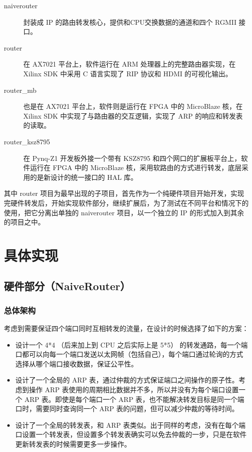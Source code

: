 \documentclass{ctexart}
\begin{document}
  \begin{description}
    \item[naiverouter] 封装成 IP 的路由转发核心，提供和CPU交换数据的通道和四个 RGMII 接口。
    \item[router]  在 AX7021 平台上，软件运行在 ARM 处理器上的完整路由器实现，在 Xilinx SDK 中采用 C 语言实现了 RIP 协议和 HDMI 的可视化输出。
    \item[router\_mb] 也是在 AX7021 平台上，软件则是运行在 FPGA 中的 MicroBlaze  核，在 Xilinx SDK 中实现了与路由器的交互逻辑，实现了 ARP 的响应和转发表的读取。
    \item[router\_ksz8795] 在 Pynq-Z1 开发板外接一个带有 KSZ8795 和四个网口的扩展板平台上，软件运行在 FPGA 中的 MicroBlaze 核，采用软路由的方式进行转发，底层采用的是新设计的统一接口的 HAL 库。
  \end{description}

  其中 router 项目为最早出现的子项目，首先作为一个纯硬件项目开始开发，实现完硬件转发后，开始实现软件部分，继续扩展后，为了测试在不同平台和情况下的使用，把它分离出单独的 naiverouter 项目，以一个独立的 IP 的形式加入到其余的项目之中。

\section{具体实现}
\subsection{硬件部分（NaiveRouter）}
\subsubsection{总体架构}
  考虑到需要保证四个端口同时互相转发的流量，在设计的时候选择了如下的方案：
  
  \begin{itemize}
    \item 设计一个 4*4 （后来加上到 CPU 之后实际上是 5*5） 的转发通路，每一个端口都可以向每一个端口发送以太网帧（包括自己），每个端口通过轮询的方式选择从哪个端口接收数据，保证公平性。
    \item 设计了一个全局的 ARP 表，通过仲裁的方式保证端口之间操作的原子性。考虑到操作 ARP 表使用的周期相比数据并不多，所以并没有为每个端口设置一个 ARP 表。即使是每个端口一个 ARP 表，也不能解决转发目标是同一个端口时，需要同时查询同一个 ARP 表的问题，但可以减少仲裁的等待时间。
    \item 设计了一个全局的转发表，和 ARP 表类似。出于同样的考虑，没有在每个端口设置一个转发表，但设置多个转发表确实可以免去仲裁的一步，只是在软件更新转发表的时候需要更多一步操作。
  \end{itemize}
\end{document}
